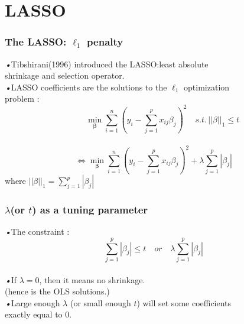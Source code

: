 \documentclass{beamer}
\begin{document}
\section{LASSO }     
\begin{frame}
\frametitle{The LASSO\hspace{1mm}: $\ell_1$ penalty }  
\emph{•}Tibshirani\hspace{1mm}(1996) introduced the LASSO\hspace{0.5mm}:\hspace{0.5mm}least absolute
\\\quad shrinkage and selection operator.
\\\emph{•}LASSO coefficients are the solutions to the $\ell_1$ optimization
\\\quad problem :
\\\begin{equation}
\quad\quad\, \min\limits_{\boldsymbol{\beta}}\sum_{i=1}^n(y_i-\sum_{j=1}^px_{ij}\beta_j)^2 \quad s.t.\, ||\beta||_1\leq{t}
\end{equation} 
\\\begin{equation}
\Leftrightarrow \min\limits_{\boldsymbol{\beta}}\sum_{i=1}^n(y_i-\sum_{j=1}^px_{ij}\beta_j)^2+\lambda\sum_{j=1}^p|\beta_j|
\end{equation} 
\quad where $||\beta||_1 = \sum_{j=1}^p|\beta_j|$
\end{frame}

\begin{frame}
\frametitle{$\lambda$(or $t$) as a tuning parameter}
\emph{•}The constraint :
\\\begin{equation*}
\sum_{j=1}^p|\beta_j|\leq{t} \quad or \quad \lambda\sum_{j=1}^p|\beta_j|
\end{equation*}
\\\qquad\emph{•}If $\lambda=0$, then it means no shrinkage.
\\\qquad\quad (hence is the OLS solutions.)
\\\qquad\emph{•}Large enough $\lambda$ (or small enough $t$) will set some coefficients
\\\qquad\quad exactly equal to 0.

\end{frame}
\end{document}

